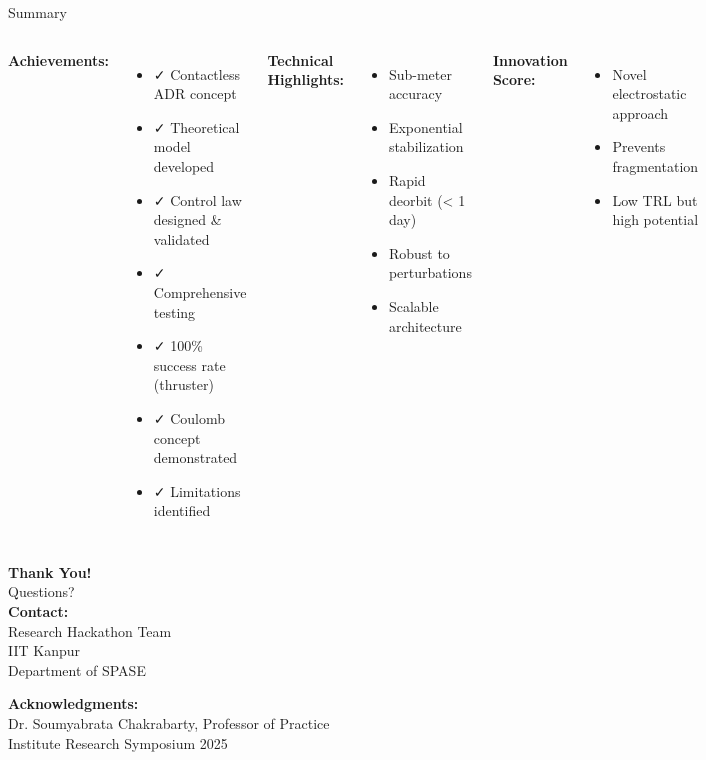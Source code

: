 \documentclass[aspectratio=169]{beamer}
\begin{document}
\begin{frame}{Summary}
\begin{columns}
\textbf{Achievements:}
\begin{itemize}
    \item ✓ Contactless ADR concept
    \item ✓ Theoretical model developed
    \item ✓ Control law designed \& validated
    \item ✓ Comprehensive testing
    \item ✓ 100\% success rate (thruster)
    \item ✓ Coulomb concept demonstrated
    \item ✓ Limitations identified
\end{itemize}

\textbf{Technical Highlights:}
\begin{itemize}
    \item Sub-meter accuracy
    \item Exponential stabilization
    \item Rapid deorbit (< 1 day)
    \item Robust to perturbations
    \item Scalable architecture
\end{itemize}

\vspace{1em}
\textbf{Innovation Score:}
\begin{itemize}
    \item Novel electrostatic approach
    \item Prevents fragmentation
    \item Low TRL but high potential
\end{itemize}
\end{columns}
\end{frame}

\begin{frame}[plain]
\begin{center}
\Huge\textbf{Thank You!}\\[1em]

\Large Questions?\\[2em]

\normalsize
\textbf{Contact:}\\
Research Hackathon Team\\
IIT Kanpur\\
Department of SPASE\\
\vspace{0.5em}

\textbf{Acknowledgments:}\\
Dr. Soumyabrata Chakrabarty, Professor of Practice\\
Institute Research Symposium 2025
\end{center}
\end{frame}
\end{document}
